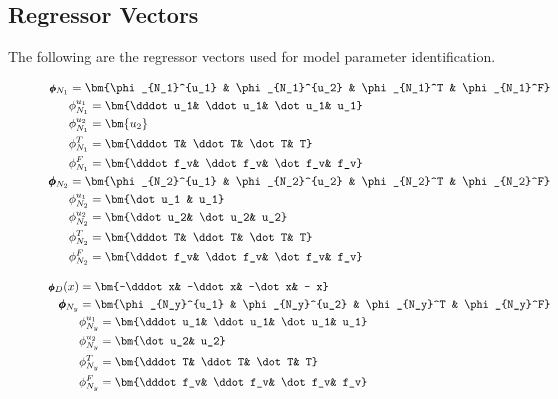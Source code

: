 \subsection*{Regressor Vectors}
The following are the regressor vectors used for model parameter identification.
\begin{figure}[H]
\begin{minipage}{0.45\columnwidth}
    \begin{align*}
        \footnotesize
        \pmb \phi_{N_1} &= \bm{\phi_{N_1}^{u_1} & \phi_{N_1}^{u_2} & \phi_{N_1}^T & \phi_{N_1}^F}\\
       & \phi_{N_1}^{u_1} = \bm{\dddot u_1& \ddot u_1& \dot u_1&  u_1}\\
       & \phi_{N_1}^{u_2} = \bm{u_2}\\
       & \phi_{N_1}^T = \bm{\dddot T& \ddot T& \dot T&  T}\\
       & \phi_{N_1}^F = \bm{\dddot f_v& \ddot f_v& \dot f_v&  f_v}\\
        \pmb \phi_{N_2} &= \bm{\phi_{N_2}^{u_1} & \phi_{N_2}^{u_2} & \phi_{N_2}^T & \phi_{N_2}^F}\\
       & \phi_{N_2}^{u_1} = \bm{\dot u_1 & u_1}\\
       & \phi_{N_2}^{u_2} = \bm{\ddot u_2& \dot u_2&  u_2}\\
       & \phi_{N_2}^T = \bm{\dddot T& \ddot T& \dot T&  T}\\
       & \phi_{N_2}^F = \bm{\dddot f_v& \ddot f_v& \dot f_v&  f_v}
    \end{align*}
\end{minipage}
\begin{minipage}{0.45\columnwidth}
    \begin{align*}
        \footnotesize
        \pmb \phi_D(x) &= \bm{-\dddot x& -\ddot x& -\dot x& - x}\\
         \pmb \phi_{N_y} &= \bm{\phi_{N_y}^{u_1} & \phi_{N_y}^{u_2} & \phi_{N_y}^T & \phi_{N_y}^F}\\
       & \phi_{N_y}^{u_1} = \bm{\dddot u_1& \ddot u_1& \dot u_1&  u_1}\\
       & \phi_{N_y}^{u_2} = \bm{\dot u_2&  u_2}\\
       & \phi_{N_y}^T = \bm{\dddot T& \ddot T& \dot T&  T}\\
       & \phi_{N_y}^F = \bm{\dddot f_v& \ddot f_v& \dot f_v&  f_v}
    \end{align*}
\end{minipage}
\end{figure}
